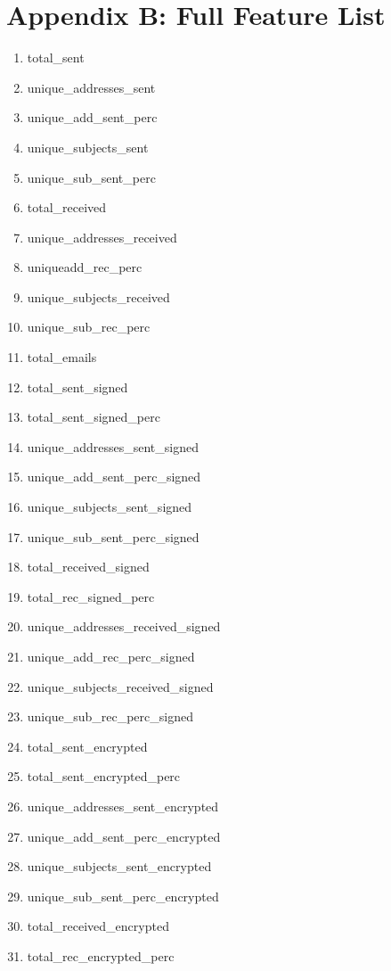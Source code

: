 \documentclass[12pt]{report}
\begin{document}
\chapter*{Appendix B: Full Feature List}
\begin{multicols}{2}
\begin{enumerate}
	\setlength\itemsep{-1em}
	\item total\_sent
	\item unique\_addresses\_sent
	\item unique\_add\_sent\_perc
	\item unique\_subjects\_sent
	\item unique\_sub\_sent\_perc
	\item total\_received
	\item unique\_addresses\_received
	\item uniqueadd\_rec\_perc
	\item unique\_subjects\_received
	\item unique\_sub\_rec\_perc
	\item total\_emails
	\item total\_sent\_signed
	\item total\_sent\_signed\_perc
	\item unique\_addresses\_sent\_signed
	\item unique\_add\_sent\_perc\_signed
	\item unique\_subjects\_sent\_signed
	\item unique\_sub\_sent\_perc\_signed
	\item total\_received\_signed
	\item total\_rec\_signed\_perc
	\item unique\_addresses\_received\_signed
	\item unique\_add\_rec\_perc\_signed
	\item unique\_subjects\_received\_signed
	\item unique\_sub\_rec\_perc\_signed
	\item total\_sent\_encrypted
	\item total\_sent\_encrypted\_perc
	\item unique\_addresses\_sent\_encrypted
	\item unique\_add\_sent\_perc\_encrypted
	\item unique\_subjects\_sent\_encrypted
	\item unique\_sub\_sent\_perc\_encrypted
	\item total\_received\_encrypted
	\item total\_rec\_encrypted\_perc

\end{enumerate}
\end{multicols}
\end{document}
